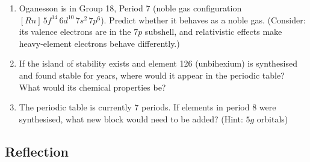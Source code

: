 \documentclass[12pt, a4paper]{book}
\begin{document}
\begin{deepbox}
\begin{enumerate}[label=\textbf{D\arabic*.}]
        \begin{enumerate}[label=(\alph*)]
          \item Oganesson is in Group 18, Period 7
                (noble gas configuration $[Rn]\,5f^{14}\,6d^{10}\,7s^2\,7p^6$).
                Predict whether it behaves as a noble gas.
                (Consider: its valence electrons are in
                the $7p$ subshell, and relativistic effects
                make heavy-element electrons behave differently.)
          \item If the island of stability exists and element 126
                (unbihexium) is synthesised and found stable
                for years, where would it appear in the periodic
                table?
                What would its chemical properties be?
          \item The periodic table is currently 7 periods.
                If elements in period 8 were synthesised,
                what new block would need to be added?
                (Hint: $5g$ orbitals)
        \end{enumerate}

\end{enumerate}
\end{deepbox}

\subsection*{Reflection}
\end{document}
